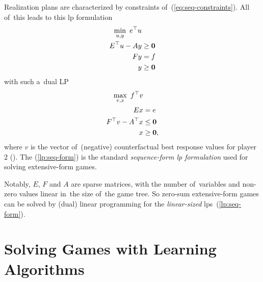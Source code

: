 Realization plans are characterized by constraints of~(\ref{eq:seq-constraints}).
All of~this leads to this \acrshort{lp} formulation
\begin{equation}
  \label{lp:seq-dual}
  \begin{split}
    \min_{u, y}\  e^\top u &\\
    E^\top u - Ay &\ge \boldsymbol{0} \\
    Fy &= f \\
    y &\ge \boldsymbol{0}
  \end{split}
\end{equation}
with such a~dual LP
\begin{equation}
  \label{lp:seq-form}
  \begin{split}
    \max_{v, x}\  f^\top v & \\
    Ex &= e \\
    F^\top v - A^\top x &\le \boldsymbol{0} \\
    x &\ge \boldsymbol{0},
  \end{split}
\end{equation}
where $v$ is the vector of~(negative) counterfactual best response values for player~$2$ (\cite{Cermak2014practical, AGT07}).
The (\ref{lp:seq-form}) is the standard \emph{sequence-form \acrshort{lp} formulation} used for solving extensive-form games.

Notably, $E$, $F$ and $A$ are sparse matrices, with the number of~variables and non-zero values linear in~the size of~the game tree.
So zero-sum extensive-form games can be solved by (dual) linear programming for the \emph{linear-sized} \acrshort{lp}s~(\ref{lp:seq-form}).

\section{Solving Games with Learning Algorithms}
\todo

